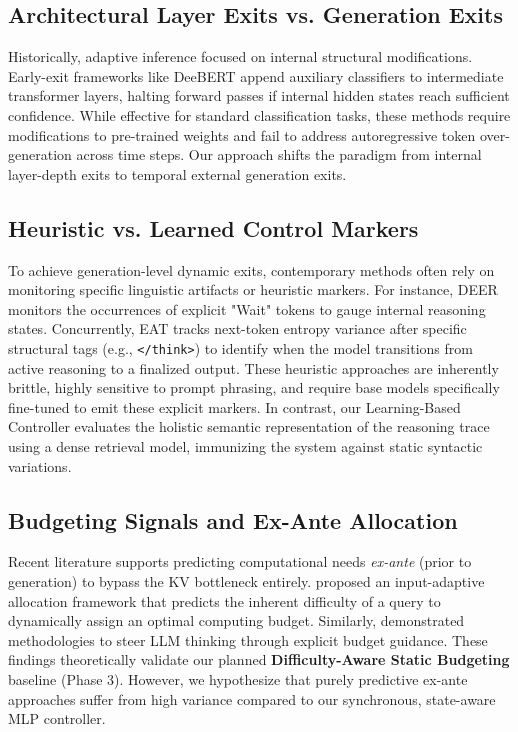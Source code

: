 \documentclass[11pt]{article}
\begin{document}
\subsection{Architectural Layer Exits vs. Generation Exits}
Historically, adaptive inference focused on internal structural modifications. Early-exit frameworks like DeeBERT \cite{xin2020deebert} append auxiliary classifiers to intermediate transformer layers, halting forward passes if internal hidden states reach sufficient confidence. While effective for standard classification tasks, these methods require modifications to pre-trained weights and fail to address autoregressive token over-generation across time steps. Our approach shifts the paradigm from internal layer-depth exits to temporal external generation exits.

\subsection{Heuristic vs. Learned Control Markers}
To achieve generation-level dynamic exits, contemporary methods often rely on monitoring specific linguistic artifacts or heuristic markers. For instance, DEER \cite{yang2025dynamic} monitors the occurrences of explicit "Wait" tokens to gauge internal reasoning states. Concurrently, EAT \cite{wang2025entropy} tracks next-token entropy variance after specific structural tags (e.g., \verb|</think>|) to identify when the model transitions from active reasoning to a finalized output. These heuristic approaches are inherently brittle, highly sensitive to prompt phrasing, and require base models specifically fine-tuned to emit these explicit markers. In contrast, our Learning-Based Controller evaluates the holistic semantic representation of the reasoning trace using a dense retrieval model, immunizing the system against static syntactic variations.

\subsection{Budgeting Signals and Ex-Ante Allocation}
Recent literature supports predicting computational needs \textit{ex-ante} (prior to generation) to bypass the KV bottleneck entirely. \citet{snell2025learning} proposed an input-adaptive allocation framework that predicts the inherent difficulty of a query to dynamically assign an optimal computing budget. Similarly, \citet{xie2025steering} demonstrated methodologies to steer LLM thinking through explicit budget guidance. These findings theoretically validate our planned \textbf{Difficulty-Aware Static Budgeting} baseline (Phase 3). However, we hypothesize that purely predictive ex-ante approaches suffer from high variance compared to our synchronous, state-aware MLP controller.
\end{document}
